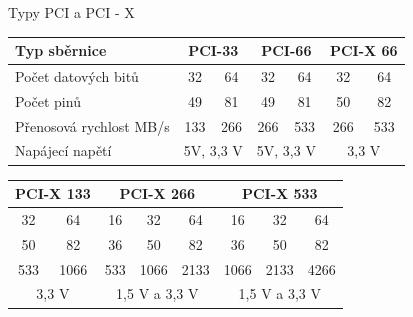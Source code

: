 \documentclass[aspectratio=43]{beamer}
\begin{document}
\begin{frame}{Typy PCI a PCI - X}

    \begin{table}[]
        \begin{tabular}{|l|cc|cc|cc|}
        \hline
        Typ sběrnice        & \multicolumn{2}{c|}{PCI-33}    & \multicolumn{2}{c|}{PCI-66}    & \multicolumn{2}{c|}{PCI-X 66} \\ \hline
        Počet datových bitů & \multicolumn{1}{c|}{32}  & 64  & \multicolumn{1}{c|}{32}  & 64  & \multicolumn{1}{c|}{32}  & 64 \\ \hline
        Počet pinů          & \multicolumn{1}{c|}{49}  & 81  & \multicolumn{1}{c|}{49}  & 81  & \multicolumn{1}{c|}{50}  & 82 \\ \hline
        Přenosová rychlost MB/s & \multicolumn{1}{c|}{133} & 266 & \multicolumn{1}{c|}{266} & 533 & \multicolumn{1}{c|}{266} & 533 \\ \hline
        Napájecí napětí     & \multicolumn{2}{c|}{5V, 3,3 V} & \multicolumn{2}{c|}{5V, 3,3 V} & \multicolumn{2}{c|}{3,3 V}    \\ \hline
        \end{tabular}
    \end{table}

    \begin{table}[]
        \begin{tabular}{|cc|ccc|ccc|}
        \hline
        \multicolumn{2}{|c|}{PCI-X 133} & \multicolumn{3}{c|}{PCI-X 266}                         & \multicolumn{3}{c|}{PCI-X 533}                         \\ \hline
        \multicolumn{1}{|c|}{32}  & 64  & \multicolumn{1}{c|}{16} & \multicolumn{1}{c|}{32} & 64 & \multicolumn{1}{c|}{16} & \multicolumn{1}{c|}{32} & 64 \\ \hline
        \multicolumn{1}{|c|}{50}  & 82  & \multicolumn{1}{c|}{36} & \multicolumn{1}{c|}{50} & 82 & \multicolumn{1}{c|}{36} & \multicolumn{1}{c|}{50} & 82 \\ \hline
        \multicolumn{1}{|c|}{533} & 1066 & \multicolumn{1}{c|}{533} & \multicolumn{1}{c|}{1066} & 2133 & \multicolumn{1}{c|}{1066} & \multicolumn{1}{c|}{2133} & 4266 \\ \hline
        \multicolumn{2}{|c|}{3,3 V}     & \multicolumn{3}{c|}{1,5 V a 3,3 V}                     & \multicolumn{3}{c|}{1,5 V a 3,3 V}                     \\ \hline
        \end{tabular}
    \end{table}
\end{frame}
\end{document}
